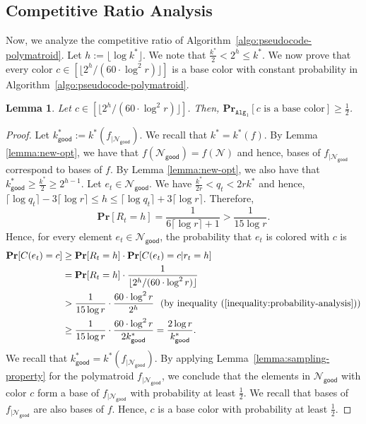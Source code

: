 \documentclass[11pt]{article}
\newtheorem{lemma}{Lemma}
\theoremstyle{definition}
\newcommand{\calN}{{\mathcal{N}}}
\newcommand{\good}{\mathsf{good}}
\begin{document}
\subsection{Competitive Ratio Analysis}\label{subsection:ratio-analysis}
Now, we analyze the competitive ratio of Algorithm~\ref{algo:pseudocode-polymatroid}. 
Let $h:=\lfloor \log k^* \rfloor$. We note that $\frac{k^*}{2}< 2^h \leq k^*$. We now prove that every color $c\in [\lfloor 2^h/ (60\cdot \log^2 r)\rfloor]$ is a base color with constant probability in Algorithm~\ref{algo:pseudocode-polymatroid}.

\begin{lemma}\label{lemma:polymatroid-proper-color-probability}
    Let $c \in [\lfloor 2^h/ (60\cdot \log^2 r)\rfloor]$. Then, $\mathbf{Pr}_{\texttt{Alg$_1$} }[c \text{ is a base color}]\geq \frac{1}{2}$.
\end{lemma}
\begin{proof}
    Let $k^*_{\good}:=k^*(f_{|\calN_{\good}})$. We recall that $k^*=k^*(f)$. 
    By Lemma \ref{lemma:new-opt}, we have that $f(\calN_{\good})=f(\calN)$ and hence, bases of $f_{|\calN_{\good}}$ correspond to bases of $f$. By Lemma \ref{lemma:new-opt}, we also have that  
    $k^*_{\good}\geq \frac{k^*}{2}\geq 2^{h-1}$. Let $e_t\in \mathcal{N}_{\good}$. We have $\frac{k^*}{2r}< q_t < 2rk^*$ and hence, $\lceil \log q_t \rceil -3\lceil \log r\rceil \leq h\leq \lceil \log q_t \rceil+3\lceil \log r \rceil$. Therefore,
    \begin{equation}\label{inequality:probability-analysis}
        \mathbf{Pr}[R_t=h]=\frac{1}{6\lceil \log r \rceil+1}>\frac{1}{15\log r}.
    \end{equation}
    Hence, for every element $e_t\in \mathcal{N}_{\good}$, the probability that $e_t$ is colored with $c$ is
    $$\begin{aligned}
        \mathbf{Pr}[C(e_t)=c] &\geq \mathbf{Pr}[R_t=h]\cdot \mathbf{Pr}[C(e_t)=c|r_t=h] \\
        &= \mathbf{Pr}[R_t=h] \cdot \frac{1}{\lfloor 2^h/ (60\cdot \log^2 r)\rfloor} \\
        &> \frac{1}{15\log r}\cdot \frac{60\cdot \log^2 r}{2^h} \ \ \text{(by inequality~(\ref{inequality:probability-analysis}))}\\
        &\geq \frac{1}{15\log r}\cdot \frac{60\cdot \log^2 r}{2k_{\good}^*}= \frac{2\log r}{k^*_{\good}}.
    \end{aligned}$$
    We recall that $k^*_{\good}=k^*(f_{|\calN_{\good}})$. By applying Lemma~\ref{lemma:sampling-property} for the polymatroid $f_{|\mathcal{N}_{\good}}$, we conclude that the elements in $\mathcal{N}_{\good}$ with color $c$ form a base of $f_{|\mathcal{N}_{\good}}$ with probability at least $\frac{1}{2}$. We recall that bases of $f_{|\calN_{\good}}$ are also bases of $f$. 
Hence, $c$ is a base color with probability at least $\frac{1}{2}$.
\end{proof}
\end{document}
